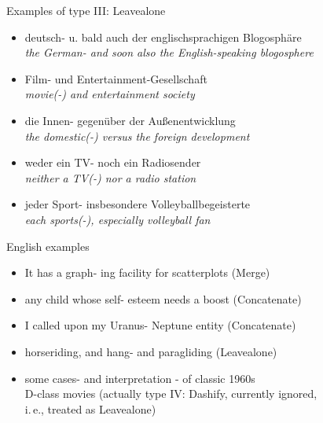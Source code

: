 \begin{frame}
  {Examples of type III: Leavealone}
  \begin{itemize}
    \item \alert{deutsch- u.} bald auch der englischsprachigen Blogosphäre\\
      \textit{the German- and soon also the English-speaking blogosphere}
    \item \alert{Film- und} Entertainment-Gesellschaft\\
      \textit{movie(-) and entertainment society}
    \item die \alert{Innen- gegenüber} der Außenentwicklung\\
      \textit{the domestic(-) versus the foreign development}
    \item weder ein \alert{TV- noch} ein Radiosender\\
      \textit{neither a TV(-) nor a radio station}
    \item jeder \alert{Sport- insbesondere} Volleyballbegeisterte\\
      \textit{each sports(-), especially volleyball fan}\\
  \end{itemize}
\end{frame}

\begin{frame}
  {English examples}
  \begin{itemize}
    \item It has a \alert{graph- ing} facility for scatterplots (Merge)
    \item any child whose \alert{self- esteem} needs a boost (Concatenate)
    \item I called upon my \alert{Uranus- Neptune} entity (Concatenate)
    \item horseriding, and \alert{hang- and} paragliding (Leavealone)

      \vspace{0.5cm}
    \item some \alert{cases- and} interpretation - of classic 1960s\\
      D-class movies (actually type IV: Dashify, currently ignored,\\
      i.\,e., treated as Leavealone)
  \end{itemize}
\end{frame}


